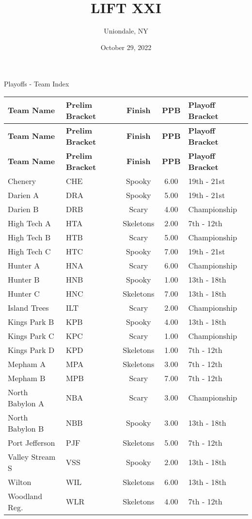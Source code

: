 \documentclass{article}%
\title{LIFT XXI}%
\author{Uniondale, NY}%
\date{October 29, 2022}%
\begin{document}
%
\normalsize%
%
\maketitle%
\vspace*{48pt}%
\begin{center}%
\begin{Huge}%
Playoffs {-} Team Index%
\end{Huge}%
\end{center}%
\newpage%
\pagestyle{fancy}%
\fancyhf{}%
%
%
%
%
%
\begin{longtable}{|l|lcc|l|}%
\rowcolor{gray!30}%
\hline%
\textbf{Team Name} &\textbf{Prelim Bracket}&\textbf{Finish}&\textbf{PPB}&\textbf{Playoff Bracket}\\%
\hline%
\endhead%
\hline%
\rowcolor{gray!25}%
\textbf{Team Name} &\textbf{Prelim Bracket}&\textbf{Finish}&\textbf{PPB}&\textbf{Playoff Bracket}\\%
\hline%
\endfoot%
\hline%
\hline\rowcolor{gray!25}%
\textbf{Team Name} &\textbf{Prelim Bracket}&\textbf{Finish}&\textbf{PPB}&\textbf{Playoff Bracket}\\%
\hline%
\endlastfoot%
\hline%
Chenery&CHE&Spooky&6.00&19th {-} 21st\\%
Darien A&DRA&Spooky&5.00&19th {-} 21st\\%
Darien B&DRB&Scary&4.00&Championship\\%
High Tech A&HTA&Skeletons&2.00&7th {-} 12th\\%
High Tech B&HTB&Scary&5.00&Championship\\%
High Tech C&HTC&Spooky&7.00&19th {-} 21st\\%
Hunter A&HNA&Scary&6.00&Championship\\%
Hunter B&HNB&Spooky&1.00&13th {-} 18th\\%
Hunter C&HNC&Skeletons&7.00&13th {-} 18th\\%
Island Trees&ILT&Scary&2.00&Championship\\%
Kings Park B&KPB&Spooky&4.00&13th {-} 18th\\%
Kings Park C&KPC&Scary&1.00&Championship\\%
Kings Park D&KPD&Skeletons&1.00&7th {-} 12th\\%
Mepham A&MPA&Skeletons&3.00&7th {-} 12th\\%
Mepham B&MPB&Scary&7.00&7th {-} 12th\\%
North Babylon A&NBA&Scary&3.00&Championship\\%
North Babylon B&NBB&Spooky&3.00&13th {-} 18th\\%
Port Jefferson&PJF&Skeletons&5.00&7th {-} 12th\\%
Valley Stream S&VSS&Spooky&2.00&13th {-} 18th\\%
Wilton&WIL&Skeletons&6.00&13th {-} 18th\\%
Woodland Reg.&WLR&Skeletons&4.00&7th {-} 12th\\%
\end{longtable}%
\end{document}
